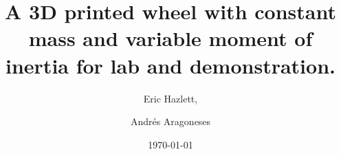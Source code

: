 \documentclass[prb,preprint]{revtex4-1}
\begin{document}

\title{A 3D printed wheel with constant mass and variable moment of inertia for lab and demonstration.}

\author{Eric Hazlett,  }
\author{Andr\'es Aragoneses}


\date{\today}




\maketitle %
{\large{
\begin{center}
\bf{}
\end{center}
}}
\end{document}
